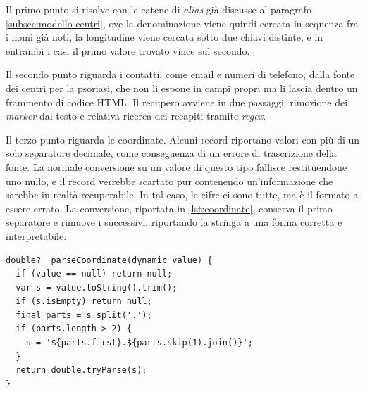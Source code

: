 Il primo punto si risolve con le catene di \textit{alias} già discusse al paragrafo \ref{subsec:modello-centri},
ove la denominazione viene quindi cercata in sequenza fra i nomi già noti, la longitudine viene cercata sotto
due chiavi distinte, e in entrambi i casi il primo valore trovato vince sul secondo.

Il secondo punto riguarda i contatti, come email e numeri di telefono, dalla fonte dei centri per la psoriasi,
che non li espone in campi propri ma li lascia dentro un frammento di codice HTML.
Il recupero avviene in due passaggi: rimozione dei \textit{marker} dal testo e relativa ricerca dei recapiti tramite \textit{regex}.


Il terzo punto riguarda le coordinate.
Alcuni record riportano valori con più di un solo separatore decimale, come conseguenza di un errore di trascrizione della fonte.
La normale conversione su un valore di questo tipo fallisce restituendone uno nullo, e il record verrebbe scartato pur
contenendo un'informazione che sarebbe in realtà recuperabile.
In tal caso, le cifre ci sono tutte, ma è il formato a essere errato.
La conversione, riportata in \ref{lst:coordinate}, conserva il primo separatore e rimuove i successivi,
riportando la stringa a una forma corretta e interpretabile.

\begin{listing}[H]
\begin{verbatim}
double? _parseCoordinate(dynamic value) {
  if (value == null) return null;
  var s = value.toString().trim();
  if (s.isEmpty) return null;
  final parts = s.split('.');
  if (parts.length > 2) {
    s = '${parts.first}.${parts.skip(1).join()}';
  }
  return double.tryParse(s);
}
\end{verbatim}
\caption{Conversione di una coordinata, con recupero dei valori che riportano più separatori decimali.}
\label{lst:coordinate}
\end{listing}

